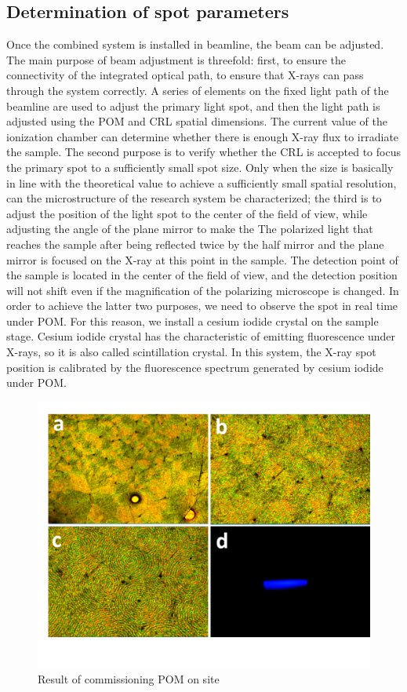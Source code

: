 \documentclass{Head}
\begin{document}
\subsection{Determination of spot parameters}
Once the combined system is installed in beamline, the beam can be adjusted.
The main purpose of beam adjustment is threefold: first, to ensure the connectivity of the integrated optical path, to ensure that X-rays can pass through the system correctly.
A series of elements on the fixed light path of the beamline are used to adjust the primary light spot, and then the light path is adjusted using the POM and CRL spatial dimensions.
The current value of the ionization chamber can determine whether there is enough X-ray flux to irradiate the sample.
The second purpose is to verify whether the CRL is accepted to focus the primary spot to a sufficiently small spot size.
Only when the size is basically in line with the theoretical value to achieve a sufficiently small spatial resolution, can the microstructure of the research system be characterized; the third is to adjust the position of the light spot to the center of the field of view, while adjusting the angle of the plane mirror to make the The polarized light that reaches the sample after being reflected twice by the half mirror and the plane mirror is focused on the X-ray at this point in the sample.
The detection point of the sample is located in the center of the field of view, and the detection position will not shift even if the magnification of the polarizing microscope is changed.
In order to achieve the latter two purposes, we need to observe the spot in real time under POM.
For this reason, we install a cesium iodide crystal on the sample stage. Cesium iodide crystal has the characteristic of emitting fluorescence under X-rays, so it is also called scintillation crystal. In this system, the X-ray spot position is calibrated by the fluorescence spectrum generated by cesium iodide under POM.
\begin{figure}
    \centering
    \includegraphics[scale=0.5]{Figures/Fig5CommissionPOMOnSite.png}
    \caption{Result of commissioning POM on site}
    \label{pictures}
\end{figure}
\end{document}
